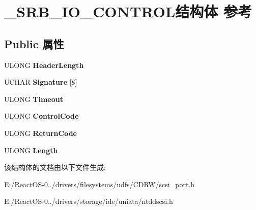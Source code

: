 \hypertarget{struct___s_r_b___i_o___c_o_n_t_r_o_l}{}\section{\+\_\+\+S\+R\+B\+\_\+\+I\+O\+\_\+\+C\+O\+N\+T\+R\+O\+L结构体 参考}
\label{struct___s_r_b___i_o___c_o_n_t_r_o_l}
\subsection*{Public 属性}
\begin{DoxyCompactItemize}
\item 
\mbox{\label{struct___s_r_b___i_o___c_o_n_t_r_o_l_a9f3b02d3704a223e5aa4c4ccc4ce7d24}} 
U\+L\+O\+NG {\bfseries Header\+Length}
\item 
\mbox{\label{struct___s_r_b___i_o___c_o_n_t_r_o_l_a0ee6fcd2878696e918fed8ff9d30bfcc}} 
U\+C\+H\+AR {\bfseries Signature} \mbox{[}8\mbox{]}
\item 
\mbox{\label{struct___s_r_b___i_o___c_o_n_t_r_o_l_a071209b68261d61463970ff4754a14a8}} 
U\+L\+O\+NG {\bfseries Timeout}
\item 
\mbox{\label{struct___s_r_b___i_o___c_o_n_t_r_o_l_a862d673dafadc340396c3dbd20fefe6c}} 
U\+L\+O\+NG {\bfseries Control\+Code}
\item 
\mbox{\label{struct___s_r_b___i_o___c_o_n_t_r_o_l_accb2354b82aac135d09f1140d55543d6}} 
U\+L\+O\+NG {\bfseries Return\+Code}
\item 
\mbox{\label{struct___s_r_b___i_o___c_o_n_t_r_o_l_ab7dc54760945faf0be7143e6a72978f3}} 
U\+L\+O\+NG {\bfseries Length}
\end{DoxyCompactItemize}


该结构体的文档由以下文件生成\+:\begin{DoxyCompactItemize}
\item 
E\+:/\+React\+O\+S-\/0../drivers/filesystems/udfs/\+C\+D\+R\+W/scsi\+\_\+port.\+h\item 
E\+:/\+React\+O\+S-\/0../drivers/storage/ide/uniata/ntddscsi.\+h\end{DoxyCompactItemize}
